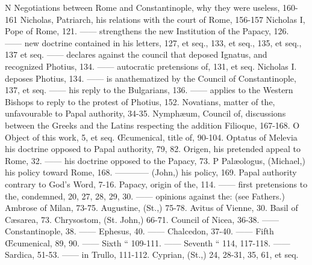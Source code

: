 N Negotiations between Rome and Constantinople, why they were useless, 160-161 Nicholas, Patriarch, his relations with the court of Rome, 156-157 Nicholas I, Pope of Rome, 121. —— strengthens the new Institution of the Papacy, 126. —— new doctrine contained in his letters, 127, et seq., 133, et seq., 135, et seq., 137 et seq. —— declares against the council that deposed Ignatus, and recognized Photius, 134. —— autocratic pretensions of, 131, et seq. Nicholas I. deposes Photius, 134. —— is anathematized by the Council of Constantinople, 137, et seq. —— his reply to the Bulgarians, 136. —— applies to the Western Bishops to reply to the protest of Photius, 152. Novatians, matter of the, unfavourable to Papal authority, 34-35. Nymphæum, Council of, discussions between the Greeks and the Latins respecting the addition Filioque, 167-168. O Object of this work, 5, et seq. Œcumenical, title of, 90-104. Optatus of Melevia his doctrine opposed to Papal authority, 79, 82. Origen, his pretended appeal to Rome, 32. —— his doctrine opposed to the Papacy, 73. P Palæologus, (Michael,) his policy toward Rome, 168. ———— (John,) his policy, 169. Papal authority contrary to God's Word, 7-16. Papacy, origin of the, 114. —— first pretensions to the, condemned, 20, 27, 28, 29, 30. —— opinions against the: (see Fathers.) Ambrose of Milan, 73-75. Augustine, (St.,) 75-78. Avitus of Vienne, 30. Basil of Cæsarea, 73. Chrysostom, (St. John,) 66-71. Council of Nicea, 36-38. —— Constantinople, 38. —— Ephesus, 40. —— Chalcedon, 37-40. —— Fifth Œcumenical, 89, 90. —— Sixth “ 109-111. —— Seventh “ 114, 117-118. —— Sardica, 51-53. —— in Trullo, 111-112. Cyprian, (St.,) 24, 28-31, 35, 61, et seq.

